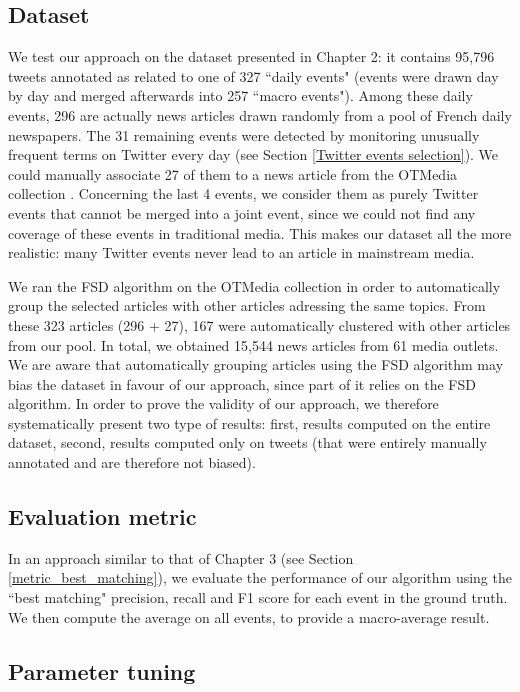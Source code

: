 \subsection{Dataset}
We test our approach on the dataset presented in Chapter 2: it contains 95,796 tweets annotated as related to one of 327 ``daily events" (events were drawn day by day and merged afterwards into 257 ``macro events"). Among these daily events, 296 are actually news articles drawn randomly from a pool of French daily newspapers. The 31 remaining events were detected by monitoring unusually frequent terms on Twitter every day (see Section \ref{Twitter events selection}). We could manually associate 27 of them to a news article from the OTMedia collection \citep{herve2019otmedia}. Concerning the last 4 events, we consider them as purely Twitter events that cannot be merged into a joint event, since we could not find any coverage of these events in traditional media. This makes our dataset all the more realistic: many Twitter events never lead to an article in mainstream media.

We ran the FSD algorithm on the OTMedia collection in order to automatically group the selected articles with other articles adressing the same topics. From these 323 articles (296 + 27), 167 were automatically clustered with other articles from our pool. In total, we obtained 15,544 news articles from 61 media outlets. We are aware that automatically grouping articles using the FSD algorithm may bias the dataset in favour of our approach, since part of it relies on the FSD algorithm. In order to prove the validity of our approach, we therefore systematically present two type of results: first, results computed on the entire dataset, second, results computed only on tweets (that were entirely manually annotated and are therefore not biased).

\subsection{Evaluation metric}
In an approach similar to that of Chapter 3 (see Section \ref{metric_best_matching}), we evaluate the performance of our algorithm using the ``best matching" precision, recall and F1 score \citep{yang1998study} for each event in the ground truth. We then compute the average on all events, to provide a macro-average result.

\subsection{Parameter tuning}

